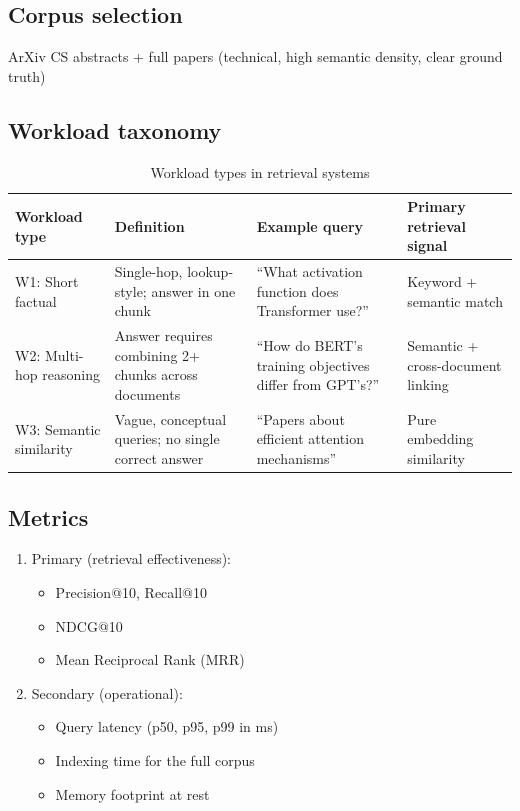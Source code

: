 \documentclass{article}
\begin{document}
\subsection{Corpus selection}
ArXiv CS abstracts + full papers (technical, high semantic density, clear ground truth)

\newpage

\subsection{Workload taxonomy}
\begin{table}[h]
\centering
\caption{Workload types in retrieval systems}
\label{tab:workloads}
\begin{tabularx}{\textwidth}{@{}lXXX@{}}
\toprule
Workload type & Definition & Example query & Primary retrieval signal \\
\midrule
W1: Short factual & Single-hop, lookup-style; answer in one chunk & ``What activation function does Transformer use?'' & Keyword + semantic match \\
W2: Multi-hop reasoning & Answer requires combining 2+ chunks across documents & ``How do BERT's training objectives differ from GPT's?'' & Semantic + cross-document linking \\
W3: Semantic similarity & Vague, conceptual queries; no single correct answer & ``Papers about efficient attention mechanisms'' & Pure embedding similarity \\
\bottomrule
\end{tabularx}
\end{table}

\subsection{Metrics}
\begin{enumerate}[leftmargin=*]
\item Primary (retrieval effectiveness):
\begin{itemize}[leftmargin=*]
\item Precision@10, Recall@10
\item NDCG@10
\item Mean Reciprocal Rank (MRR)
\end{itemize}
\item Secondary (operational):
\begin{itemize}[leftmargin=*]
\item Query latency (p50, p95, p99 in ms)
\item Indexing time for the full corpus
\item Memory footprint at rest
\end{itemize}
\end{enumerate}
\end{document}
